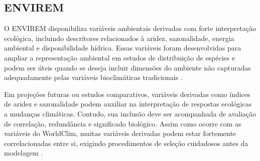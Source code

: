 \subsection{ENVIREM}

O ENVIREM disponibiliza variáveis ambientais derivadas com forte interpretação ecológica, incluindo descritores relacionados à aridez, sazonalidade, energia ambiental e disponibilidade hídrica. Essas variáveis foram desenvolvidas para ampliar a representação ambiental em estudos de distribuição de espécies e podem ser úteis quando se deseja incluir dimensões do ambiente não capturadas adequadamente pelas variáveis bioclimáticas tradicionais \parencite{title2018envirem}.

Em projeções futuras ou estudos comparativos, variáveis derivadas como índices de aridez e sazonalidade podem auxiliar na interpretação de respostas ecológicas a mudanças climáticas. Contudo, sua inclusão deve ser acompanhada de avaliação de correlação, redundância e significado biológico. Assim como ocorre com as variáveis do WorldClim, muitas variáveis derivadas podem estar fortemente correlacionadas entre si, exigindo procedimentos de seleção cuidadosos antes da modelagem \parencite{guisan2017habitat,zurell2020standard}.

